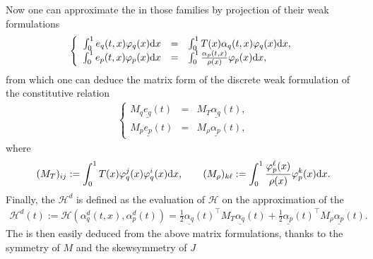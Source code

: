 \documentclass[letterpaper,10pt,english]{sphinxmanual}
\begin{document}
\sphinxAtStartPar
Now one can approximate the  in those families
by projection of their weak formulations
\begin{equation*}
\begin{split}\left\lbrace
\begin{array}{rcl}
\int_0^1 e_q(t,x) \varphi_q(x) {\rm d}x &=& \int_0^1 T(x) \alpha_q(t,x) \varphi_q(x) {\rm d}x, \\
\int_0^1 e_p(t,x) \varphi_p(x) {\rm d}x &=&  \int_0^1 \frac{\alpha_p(t,x)}{\rho(x)} \varphi_p(x) {\rm d}x,
\end{array}
\right.\end{split}
\end{equation*}
\sphinxAtStartPar
from which one can deduce the matrix form of the discrete weak
formulation of the constitutive relation
\begin{equation*}
\begin{split}\left\lbrace
\begin{array}{rcl}
M_q \underline{e_q}(t) &=& M_T \underline{\alpha_q}(t), \\
M_p \underline{e_p}(t) &=& M_\rho \underline{\alpha_p}(t),
\end{array}
\right.\end{split}
\end{equation*}
\sphinxAtStartPar
where
\begin{equation*}
\begin{split}(M_T)_{ij} := \int_0^1 T(x) \varphi_q^j(x) \varphi_q^i(x) {\rm d}x,
\qquad
(M_\rho)_{k\ell} := \int_0^1 \frac{\varphi_p^\ell(x)}{\rho(x)} \varphi_p^k(x) {\rm d}x.\end{split}
\end{equation*}
\sphinxAtStartPar
Finally, the  \(\mathcal{H}^d\) is defined
as the evaluation of \(\mathcal{H}\) on the approximation of the
\begin{equation*}
\begin{split}\mathcal{H}^d(t) := \mathcal{H}(\alpha_q^d(t,x), \alpha_p^d(t)) = \frac{1}{2} \underline{\alpha_q}(t)^\top M_T \underline{\alpha_q}(t) + \frac{1}{2} \underline{\alpha_p}(t)^\top M_\rho \underline{\alpha_p}(t).\end{split}
\end{equation*}
\sphinxAtStartPar
The  is then easily deduced from the above
matrix formulations, thanks to the symmetry of \(M\) and the
skew\sphinxhyphen{}symmetry of \(J\)
\end{document}
